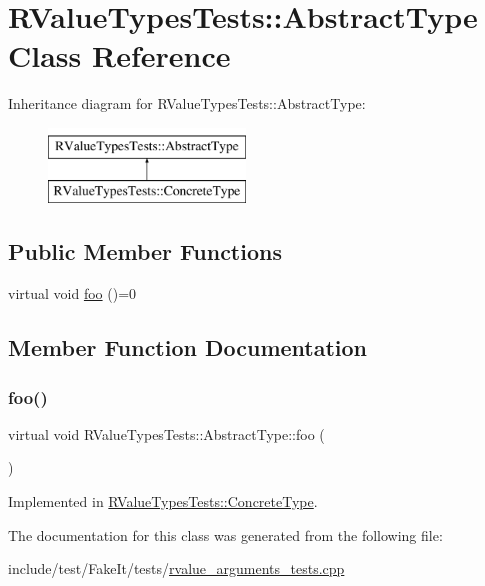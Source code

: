 \hypertarget{classRValueTypesTests_1_1AbstractType}{}\section{R\+Value\+Types\+Tests\+::Abstract\+Type Class Reference}
\label{classRValueTypesTests_1_1AbstractType}
Inheritance diagram for R\+Value\+Types\+Tests\+::Abstract\+Type\+:\begin{figure}[H]
\begin{center}
\leavevmode
\includegraphics[height=2.000000cm]{classRValueTypesTests_1_1AbstractType}
\end{center}
\end{figure}
\subsection*{Public Member Functions}
\begin{DoxyCompactItemize}
\item 
virtual void \mbox{\hyperlink{classRValueTypesTests_1_1AbstractType_add978e6db72f1d50cd897aae395b3d0d}{foo}} ()=0
\end{DoxyCompactItemize}


\subsection{Member Function Documentation}
\mbox{\label{classRValueTypesTests_1_1AbstractType_add978e6db72f1d50cd897aae395b3d0d}} 
\subsubsection{\texorpdfstring{foo()}{foo()}}
{\footnotesize\ttfamily virtual void R\+Value\+Types\+Tests\+::\+Abstract\+Type\+::foo (\begin{DoxyParamCaption}{ }\end{DoxyParamCaption})\hspace{0.3cm}{\ttfamily [pure virtual]}}



Implemented in \mbox{\hyperlink{classRValueTypesTests_1_1ConcreteType_a81934e34d992dbda4331cf4e1de0859b}{R\+Value\+Types\+Tests\+::\+Concrete\+Type}}.



The documentation for this class was generated from the following file\+:\begin{DoxyCompactItemize}
\item 
include/test/\+Fake\+It/tests/\mbox{\hyperlink{rvalue__arguments__tests_8cpp}{rvalue\+\_\+arguments\+\_\+tests.\+cpp}}\end{DoxyCompactItemize}
